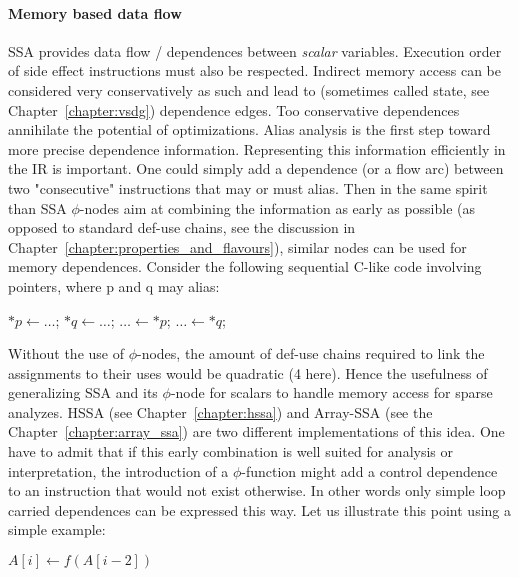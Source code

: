 \paragraph{Memory based data flow}
SSA provides data flow / dependences between \emph{scalar} variables. Execution order of side effect instructions must also be respected. Indirect memory access can be considered very conservatively as such and lead to (sometimes called state, see Chapter~\ref{chapter:vsdg}) dependence edges. Too conservative dependences annihilate the potential of optimizations. Alias analysis is the first step toward more precise dependence information. Representing this information efficiently in the IR is important. One could simply add a dependence (or a flow arc) between two "consecutive" instructions that may or must alias. Then in the same spirit than SSA $\phi$-nodes aim at combining the information as early as possible (as opposed to standard def-use chains, see the discussion in Chapter~\ref{chapter:properties_and_flavours}), similar nodes can be used for memory dependences. Consider the following sequential C-like code involving pointers, where p and q may alias:

{
\LinesNotNumbered
\qquad\qquad
\begin{algorithm}[H]
$*p \gets \ldots$; \quad
$*q \gets \ldots$; \quad
$\ldots \gets *p$; \quad
$\ldots \gets *q$;
\end{algorithm}
}

\noindent
  Without the use of $\phi$-nodes, the amount of def-use chains required to link the assignments to their uses would be quadratic (4 here). Hence the usefulness of generalizing SSA and its $\phi$-node for scalars to handle memory access for sparse analyzes. HSSA (see Chapter~\ref{chapter:hssa}) and Array-SSA (see the Chapter~\ref{chapter:array_ssa}) are two different implementations of this idea. One have to admit that if this early combination is well suited for analysis or interpretation, the introduction of a $\phi$-function might add a control dependence to an instruction that would not exist otherwise. In other words only simple loop carried dependences can be expressed this way. Let us illustrate this point using a simple example: 

{
\LinesNotNumbered
\begin{algorithm}[H]
   {
    $ A[i] \gets f(A[i-2])$\;
  }
\end{algorithm}
}

